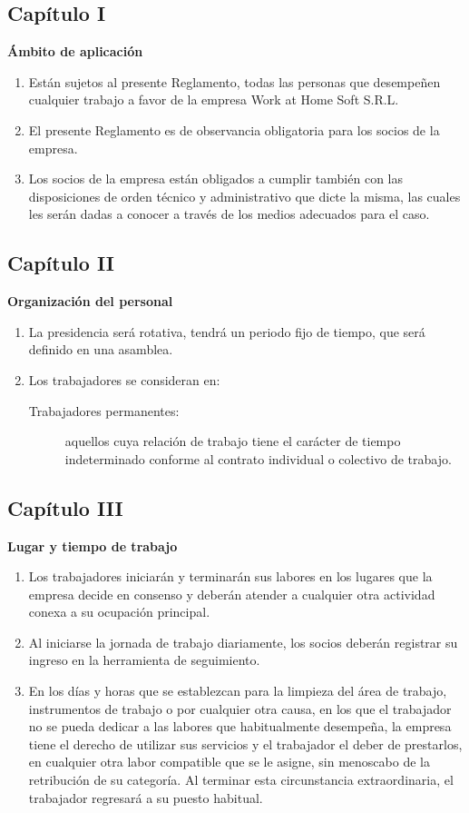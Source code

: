 \documentclass[11pt,letterpaper]{report}
\begin{document}
\subsection{Capítulo I}
\begin{center}
{\bf Ámbito de aplicación}
\end{center}
\begin{enumerate}
\item Están sujetos al presente Reglamento, todas las personas que desempeñen cualquier trabajo a favor de la empresa Work at Home Soft S.R.L.
\item El presente Reglamento es de observancia obligatoria para los socios de la empresa.
\item Los socios de la empresa están obligados a cumplir también con las disposiciones de orden técnico y administrativo que dicte la misma, las cuales les serán dadas a conocer a través de los medios adecuados para el caso.
\end{enumerate}
\subsection{Capítulo II}
\begin{center}
{\bf Organización del personal}
\end{center}
\begin{enumerate}
\item La presidencia será rotativa, tendrá un periodo fijo de tiempo, que será definido en una asamblea.
\item Los trabajadores se consideran en:
\begin{description}
\item[Trabajadores permanentes:] aquellos cuya relación de trabajo tiene el carácter de tiempo indeterminado conforme al contrato individual o colectivo de trabajo.
\end{description}
\end{enumerate}
\subsection{Capítulo III}
\begin{center}
{\bf Lugar y tiempo de trabajo}
\end{center}
\begin{enumerate}
\item  Los trabajadores iniciarán y terminarán sus labores en los lugares que la empresa decide en consenso y deberán atender a cualquier otra actividad conexa a su ocupación principal.
\item  Al iniciarse la jornada de trabajo diariamente, los socios deberán registrar su ingreso en la herramienta de seguimiento.
\item En los días y horas que se establezcan para la limpieza del área de trabajo, instrumentos de trabajo o por cualquier otra causa, en los que el trabajador no se pueda dedicar a las labores que habitualmente desempeña, la empresa tiene el derecho de utilizar sus servicios y el trabajador el deber de prestarlos, en cualquier otra labor compatible que se le asigne, sin menoscabo de la retribución de su categoría. Al terminar esta circunstancia extraordinaria, el trabajador regresará a su puesto habitual.
\end{enumerate}
\end{document}
